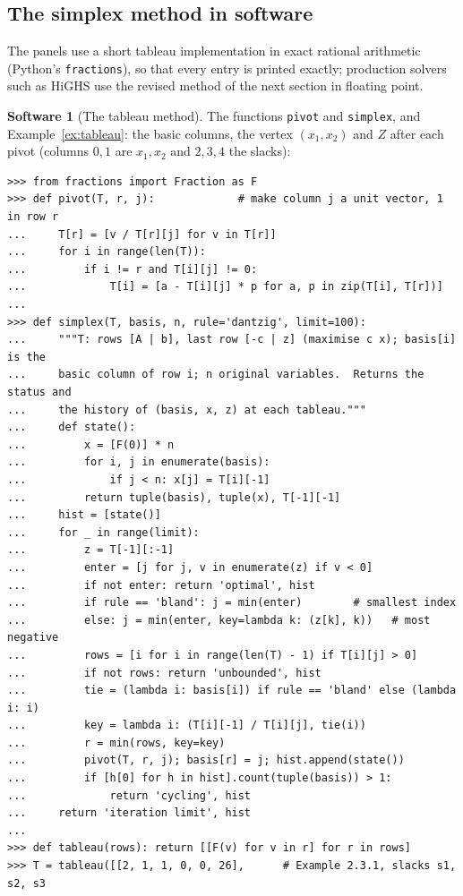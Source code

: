 \documentclass[11pt,a4paper]{article}
\numberwithin{equation}{section}
\theoremstyle{definition}
\newtheorem{software}[thm]{Software}
\begin{document}
\subsection{The simplex method in software}
\label{ssec:software3}

The panels use a short tableau implementation in exact rational arithmetic (Python's \texttt{fractions}), so that every entry is printed exactly; production solvers such as HiGHS use the revised method of the next section in floating point.

\begin{software}[The tableau method]
\label{sw:tableau}
The functions \texttt{pivot} and \texttt{simplex}, and Example~\ref{ex:tableau}: the basic columns, the vertex $(x_1, x_2)$ and $Z$ after each pivot (columns $0, 1$ are $x_1, x_2$ and $2, 3, 4$ the slacks):
{\small\begin{verbatim}
>>> from fractions import Fraction as F
>>> def pivot(T, r, j):             # make column j a unit vector, 1 in row r
...     T[r] = [v / T[r][j] for v in T[r]]
...     for i in range(len(T)):
...         if i != r and T[i][j] != 0:
...             T[i] = [a - T[i][j] * p for a, p in zip(T[i], T[r])]
...
>>> def simplex(T, basis, n, rule='dantzig', limit=100):
...     """T: rows [A | b], last row [-c | z] (maximise c x); basis[i] is the
...     basic column of row i; n original variables.  Returns the status and
...     the history of (basis, x, z) at each tableau."""
...     def state():
...         x = [F(0)] * n
...         for i, j in enumerate(basis):
...             if j < n: x[j] = T[i][-1]
...         return tuple(basis), tuple(x), T[-1][-1]
...     hist = [state()]
...     for _ in range(limit):
...         z = T[-1][:-1]
...         enter = [j for j, v in enumerate(z) if v < 0]
...         if not enter: return 'optimal', hist
...         if rule == 'bland': j = min(enter)        # smallest index
...         else: j = min(enter, key=lambda k: (z[k], k))   # most negative
...         rows = [i for i in range(len(T) - 1) if T[i][j] > 0]
...         if not rows: return 'unbounded', hist
...         tie = (lambda i: basis[i]) if rule == 'bland' else (lambda i: i)
...         key = lambda i: (T[i][-1] / T[i][j], tie(i))
...         r = min(rows, key=key)
...         pivot(T, r, j); basis[r] = j; hist.append(state())
...         if [h[0] for h in hist].count(tuple(basis)) > 1:
...             return 'cycling', hist
...     return 'iteration limit', hist
...
>>> def tableau(rows): return [[F(v) for v in r] for r in rows]
>>> T = tableau([[2, 1, 1, 0, 0, 26],      # Example 2.3.1, slacks s1, s2, s3

\end{verbatim}}
\end{software}
\end{document}
